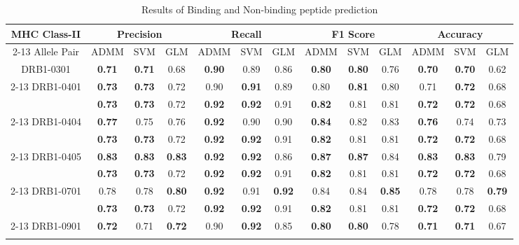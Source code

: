 \documentclass[conference,10pt,draftclsnofoot,onecolumn]{IEEEtran}
\begin{document}
\begin{table}[!t]
\caption{Results of Binding and Non-binding peptide prediction}
\label{tab:resultTable}
\centering
\begin{tabular}{|c|c|c|c|c|c|c|c|c|c|c|c|c|}
\hline
\multirow{2}{*}{MHC Class-II} & \multicolumn{3}{c|}{Precision} & \multicolumn{3}{c|}{Recall} & \multicolumn{3}{c|}{F1 Score} & \multicolumn{3}{c|}{Accuracy}\\ [2pt]
\cline{2-13}
Allele Pair & ADMM & SVM & GLM & ADMM & SVM & GLM & ADMM & SVM & GLM & ADMM & SVM & GLM \\ 
\hline

\multirow{1}{*}{DRB1-0301} & \bf 0.71 & \bf 0.71 & 0.68 & \bf 0.90 & 0.89 & 0.86 & \bf 0.80 & \bf 0.80 & 0.76 & \bf 0.70 & \bf 0.70 & 0.62\\
\cline{2-13}
DRB1-0401 & \bf 0.73 & \bf 0.73 & 0.72 & 0.90 & \bf 0.91 & 0.89 & 0.80 & \bf 0.81 & 0.80 & 0.71 & \bf 0.72 & 0.68\\
\hhline{=============}

\multirow{1}{*}{DRB1-0401} & \bf 0.73 & \bf 0.73 & 0.72 & \bf 0.92 & \bf 0.92 & 0.91 & \bf 0.82 & 0.81 & 0.81 & \bf 0.72 & \bf 0.72 & 0.68\\
\cline{2-13}
DRB1-0404  & \bf 0.77 & 0.75 & 0.76 & \bf 0.92 & 0.90 & 0.90 & \bf 0.84 & 0.82 & 0.83 & \bf 0.76 & 0.74 & 0.73\\
\hhline{=============}

\multirow{1}{*}{DRB1-0401} & \bf 0.73 & \bf 0.73 & 0.72 & \bf 0.92 & \bf 0.92 & 0.91 & \bf 0.82 & 0.81 & 0.81 & \bf 0.72 & \bf 0.72 & 0.68\\
\cline{2-13}
DRB1-0405 & \bf 0.83 & \bf 0.83 & \bf 0.83 & \bf 0.92 & \bf 0.92 & 0.86 & \bf 0.87 & \bf 0.87 & 0.84 & \bf 0.83 & \bf 0.83 & 0.79\\
\hhline{=============}

\multirow{1}{*}{DRB1-0401} & \bf 0.73 & \bf 0.73 & 0.72 & \bf 0.92 & \bf 0.92 & 0.91 & \bf 0.82 & 0.81 & 0.81 & \bf 0.72 & \bf 0.72 & 0.68\\
\cline{2-13}
DRB1-0701 & 0.78 & 0.78 & \bf 0.80 & \bf 0.92 & 0.91 & \bf 0.92 & 0.84 & 0.84 & \bf 0.85 & 0.78 & 0.78 & \bf 0.79\\
\hhline{=============}

\multirow{1}{*}{DRB1-0401} & \bf 0.73 & \bf 0.73 & 0.72 & \bf 0.92 & \bf 0.92 & 0.91 & \bf 0.82 & 0.81 & 0.81 & \bf 0.72 & \bf 0.72 & 0.68\\
\cline{2-13}
DRB1-0901 & \bf 0.72 & 0.71 & \bf 0.72 & 0.90 & \bf 0.92 & 0.85 & \bf 0.80 & \bf 0.80 & 0.78 & \bf 0.71 & \bf 0.71 & 0.67 \\
\hhline{=============}


\end{tabular}
\end{table}
\end{document}
